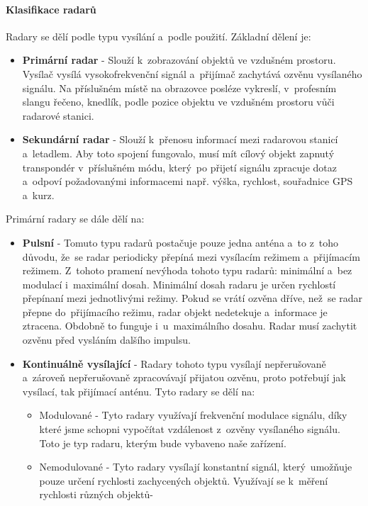 	\paragraph{Klasifikace radarů}
			Radary se dělí podle typu vysílání a~podle použití\cite{radarClasification}. Základní dělení je: 
			\begin{itemize}
				\item \textbf{Primární radar}	-	Slouží k~zobrazování objektů ve vzdušném prostoru. Vysílač vysílá vysokofrekvenční signál a~přijímač zachytává ozvěnu vysílaného signálu. Na příslušném místě na obrazovce posléze vykreslí, v~profesním slangu řečeno, knedlík, podle pozice objektu ve vzdušném prostoru vůči radarové stanici.
					
				\item \textbf{Sekundární radar}	-	Slouží k~přenosu informací mezi radarovou stanicí a~letadlem. Aby toto spojení fungovalo, musí mít cílový objekt zapnutý transpondér v~příslušném módu, který~po přijetí signálu zpracuje dotaz a~odpoví požadovanými informacemi např. výška, rychlost, souřadnice GPS a~kurz. 
			\end{itemize}
			
			Primární radary se dále dělí na:
			\begin{itemize}
				\item \textbf{Pulsní}	-	Tomuto typu radarů postačuje pouze jedna anténa a~to z~toho důvodu, že~se radar periodicky přepíná mezi vysílacím režimem a~přijímacím režimem. Z~tohoto pramení nevýhoda tohoto typu radarů: minimální a~bez modulací i~maximální dosah. Minimální dosah radaru je určen rychlostí přepínaní mezi jednotlivými režimy. Pokud se vrátí ozvěna dříve, než~se radar přepne do~přijímacího režimu, radar objekt nedetekuje a~informace je ztracena. Obdobně to funguje i~u~maximálního dosahu. Radar musí zachytit ozvěnu před vysláním dalšího impulsu.
				
				\item \textbf{Kontinuálně vysílající}	-	Radary tohoto typu vysílají nepřerušovaně a~zároveň nepřerušovaně zpracovávají přijatou ozvěnu, proto potřebují jak vysílací, tak přijímací anténu. Tyto radary se dělí na:
					\begin{itemize}
						\item Modulované - Tyto radary využívají frekvenční modulace signálu, díky které jsme schopni vypočítat vzdálenost z~ozvěny vysílaného signálu. Toto je typ radaru, kterým bude vybaveno naše zařízení.
						
						\item Nemodulované - Tyto radary vysílají konstantní signál, který~umožňuje pouze určení rychlosti zachycených objektů. Využívají se k~měření rychlosti různých objektů-
					\end{itemize}
			\end{itemize}
		
